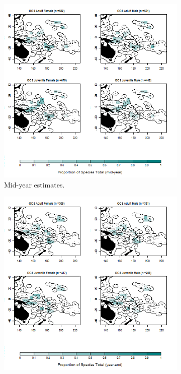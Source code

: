 \documentclass[12pt]{SCreport}
\begin{document}
\begin{landscape}
\begin{figure}
\centering
   \begin{subfigure}[b]{0.6\textwidth}
       \includegraphics[width=\textwidth]{../GRAPHICS/Defined/BI_28_Map_maturity_sex_OCS_MY}
       \caption{Mid-year estimates.}
       \label{fig:test1}
   \end{subfigure}
   \begin{subfigure}[b]{0.6\textwidth}
       \includegraphics[width=\textwidth]{../GRAPHICS/Defined/BI_27_Map_maturity_sex_OCS}

\end{subfigure}
\end{figure}
\end{landscape}
\end{document}
